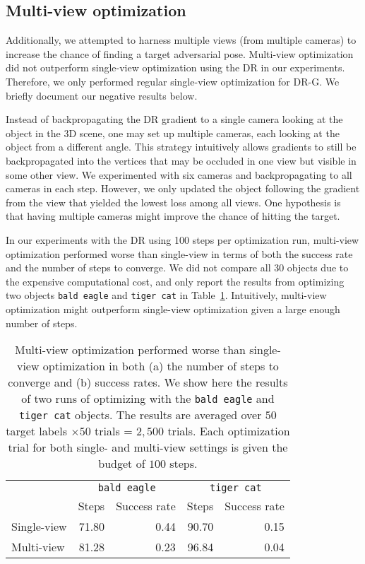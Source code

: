 \documentclass[10pt,twocolumn,letterpaper]{article}
\newcommand{\class}[1]{{\small\texttt{#1}}}
\begin{document}
\subsection{Multi-view optimization}%
\label{sec:multi-camera-optim}

Additionally, we attempted to harness multiple views (from multiple cameras) to increase the chance of finding a target adversarial pose.
Multi-view optimization did not outperform single-view optimization using the DR in our experiments.
Therefore, we only performed regular single-view optimization for DR-G.
We briefly document our negative results below.

Instead of backpropagating the DR gradient to a single camera looking at the object in the 3D scene, one may set up multiple cameras, each looking at the object from a different angle.
This strategy intuitively allows gradients to still be backpropagated into the vertices that may be occluded in one view but visible in some other view.
We experimented with six cameras and backpropagating to all cameras in each step.
However, we only updated the object following the gradient from the view that yielded the lowest loss among all views.
One hypothesis is that having multiple cameras might improve the chance of hitting the target.

In our experiments with the DR using 100 steps per optimization run, multi-view optimization performed worse than single-view in terms of both the success rate and the number of steps to converge.
We did not compare all 30 objects due to the expensive computational cost, and only report the results from optimizing two objects \class{bald eagle} and \class{tiger cat} in Table~\ref{tab:v1v6}.
Intuitively, multi-view optimization might outperform single-view optimization given a large enough number of steps.

\begin{table}[ht]
  \centering
  \begin{tabular}{l*{4}{r}}
    \toprule
    & \multicolumn{2}{c}{
    	\class{bald eagle}} & \multicolumn{2}{c}{\class{tiger cat}} \\
    \cmidrule(lr){2-3}\cmidrule(lr){4-5}
    & Steps & Success rate & Steps & Success rate \\
    \midrule
    Single-view  & 71.80 & 0.44 & 90.70 & 0.15 \\
    Multi-view & 81.28 & 0.23 & 96.84 & 0.04 \\
    \bottomrule
  \end{tabular}
  \caption{
  	Multi-view optimization performed worse than single-view optimization in both (a) the number of steps to converge and (b) success rates.
  	We show here the results of two runs of optimizing with the \class{bald eagle} and \class{tiger cat} objects.
  	The results are averaged over $50$ target labels $\times 50$ trials = $2,500$ trials.
  	Each optimization trial for both single- and multi-view settings is given the budget of $100$ steps.
  	\label{tab:v1v6}}
\end{table}
\end{document}
